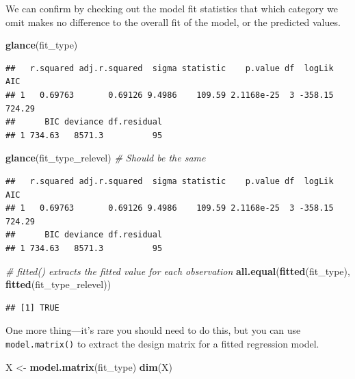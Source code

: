 \documentclass[12pt,oneside,openany]{book}
\newenvironment{Shaded}{\begin{snugshade}}{\end{snugshade}}
\newcommand{\KeywordTok}[1]{\textcolor[rgb]{0.13,0.29,0.53}{\textbf{{#1}}}}
\newcommand{\StringTok}[1]{\textcolor[rgb]{0.31,0.60,0.02}{{#1}}}
\newcommand{\CommentTok}[1]{\textcolor[rgb]{0.56,0.35,0.01}{\textit{{#1}}}}
\newcommand{\NormalTok}[1]{{#1}}
\begin{document}
We can confirm by checking out the model fit statistics that which
category we omit makes no difference to the overall fit of the model, or
the predicted values.

\begin{Shaded}
\begin{Highlighting}[]
\KeywordTok{glance}\NormalTok{(fit_type)}
\end{Highlighting}
\end{Shaded}

\begin{verbatim}
##   r.squared adj.r.squared  sigma statistic    p.value df  logLik    AIC
## 1   0.69763       0.69126 9.4986    109.59 2.1168e-25  3 -358.15 724.29
##      BIC deviance df.residual
## 1 734.63   8571.3          95
\end{verbatim}

\begin{Shaded}
\begin{Highlighting}[]
\KeywordTok{glance}\NormalTok{(fit_type_relevel)  }\CommentTok{# Should be the same}
\end{Highlighting}
\end{Shaded}

\begin{verbatim}
##   r.squared adj.r.squared  sigma statistic    p.value df  logLik    AIC
## 1   0.69763       0.69126 9.4986    109.59 2.1168e-25  3 -358.15 724.29
##      BIC deviance df.residual
## 1 734.63   8571.3          95
\end{verbatim}

\begin{Shaded}
\begin{Highlighting}[]
\CommentTok{# fitted() extracts the fitted value for each observation}
\KeywordTok{all.equal}\NormalTok{(}\KeywordTok{fitted}\NormalTok{(fit_type), }\KeywordTok{fitted}\NormalTok{(fit_type_relevel))}
\end{Highlighting}
\end{Shaded}

\begin{verbatim}
## [1] TRUE
\end{verbatim}

One more thing---it's rare you should need to do this, but you can use
\texttt{model.matrix()} to extract the design matrix for a fitted
regression model.

\begin{Shaded}
\begin{Highlighting}[]
\NormalTok{X <-}\StringTok{ }\KeywordTok{model.matrix}\NormalTok{(fit_type)}
\KeywordTok{dim}\NormalTok{(X)}
\end{Highlighting}
\end{Shaded}
\end{document}
